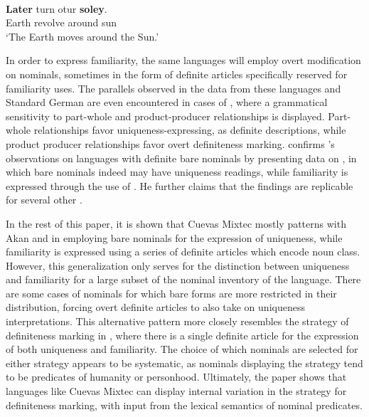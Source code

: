 \documentclass[output=paper,modfonts,nonflat]{langsci/langscibook}
\begin{document}
\begin{exe}
\ex \label{ex:cisneros:15}
 \\
\gll
\textbf{Later} turn otur \textbf{soley}.\\
Earth revolve around sun\\
\glt
`The Earth moves around the Sun.'
\end{exe}

In order to express familiarity, the same languages will employ overt modification on nominals, sometimes in the form of definite articles specifically reserved for familiarity uses.  The parallels observed in the data from these languages and Standard German are even encountered in cases of , where a grammatical sensitivity to part-whole and product-producer relationships is displayed. Part-whole relationships favor uniqueness-expressing,  as definite descriptions, while product producer relationships favor overt definiteness marking.  \citet{Jenks2015} confirms \citeauthor{Schwarz2009}'s observations on languages with definite bare nominals by presenting data on , in which bare nominals indeed may have uniqueness readings, while familiarity is expressed through the use of .  He further claims that the findings are replicable for several other .

In the rest of this paper, it is shown that Cuevas Mixtec mostly patterns with Akan and  in employing bare nominals for the expression of uniqueness, while familiarity is expressed using a series of definite articles which encode noun class.  However, this generalization only serves for the distinction between uniqueness and familiarity for a large subset of the nominal inventory of the language.  There are some cases of nominals for which bare forms are more restricted in their distribution, forcing overt definite articles to also take on uniqueness interpretations.  This alternative pattern more closely resembles the strategy of definiteness marking in , where there is a single definite article for the expression of both uniqueness and familiarity.  The choice of which nominals are selected for either strategy appears to be systematic, as nominals displaying the  strategy tend to be predicates of humanity or personhood.  Ultimately, the paper shows that languages like Cuevas Mixtec can display internal variation in the strategy for definiteness marking, with input from the lexical semantics of nominal predicates.
\end{document}
